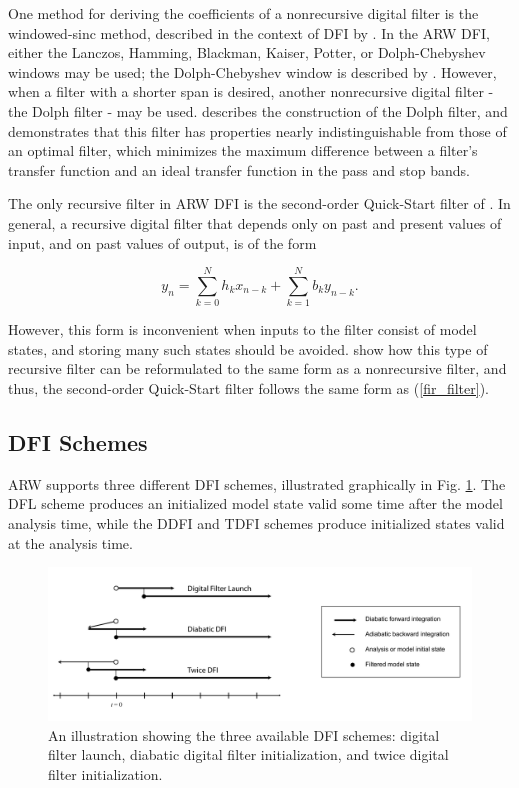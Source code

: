 One method for deriving the coefficients of a nonrecursive digital filter is 
the windowed-sinc method, described in the context of DFI by \cite{lynchhuang92}. 
In the ARW DFI, either the Lanczos, Hamming, Blackman, Kaiser, Potter, or 
Dolph-Chebyshev windows may be used; the Dolph-Chebyshev window is described 
by \cite{lynch97}. However, when a filter with a shorter span is desired, 
another nonrecursive digital filter - the Dolph filter - may be used. \cite{lynch97} 
describes the construction of the Dolph filter, and demonstrates that this 
filter has properties nearly indistinguishable from those of an optimal filter, 
which minimizes the maximum difference between a filter's transfer function 
and an ideal transfer function in the pass and stop bands. 

The only recursive filter in ARW DFI is the second-order Quick-Start 
filter of \cite{lynchhuang94}. In general, a recursive digital filter that 
depends only on past and present values of input, and on past values of 
output, is of the form

\begin{equation}
y_n = \sum_{k=0}^{N} h_k x_{n-k} + \sum_{k=1}^{N} b_k y_{n-k}.
\end{equation}

\noindent
However, this form is inconvenient when inputs to the filter consist of 
model states, and storing many such states should be avoided. \cite{lynchhuang94} 
show how this type of recursive filter can be reformulated to the same 
form as a nonrecursive filter, and thus, the second-order 
Quick-Start filter follows the same form as (\ref{fir_filter}).

\subsection{DFI Schemes}

ARW supports three different DFI schemes, illustrated graphically in 
Fig. \ref{figure:dfi_types}. The DFL scheme produces an initialized model 
state valid some time after the model analysis time, while the DDFI and TDFI 
schemes produce initialized states valid at the analysis time.

%
%
\begin{figure}
  \centering
  \includegraphics[width=6.5in]{figures/dfi_schemes.pdf}
  \caption{\label{figure:dfi_types}An illustration showing the three available DFI schemes: digital filter 
  launch, diabatic digital filter initialization, and twice digital filter initialization.}
\end{figure}

